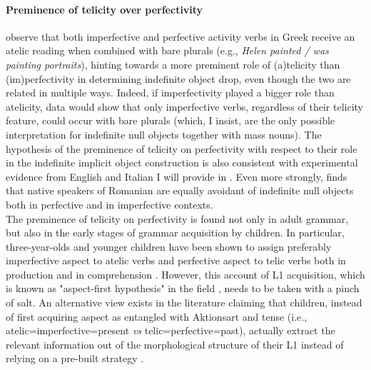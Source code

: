 \paragraph{Preminence of telicity over perfectivity}
\textcite[1598]{TsimpliPapadopoulou2006} observe that both imperfective and perfective activity verbs in Greek receive an atelic reading when combined with bare plurals (e.g., \textit{Helen painted / was painting portraits}), hinting towards a more preminent role of (a)telicity than (im)perfectivity in determining indefinite object drop, even though the two are related in multiple ways. Indeed, if imperfectivity played a bigger role than atelicity, data would show that only imperfective verbs, regardless of their telicity feature, could occur with bare plurals (which, I insist, are the only possible interpretation for indefinite null objects together with mass nouns). The hypothesis of the preminence of telicity on perfectivity with respect to their role in the indefinite implicit object construction is also consistent with experimental evidence from English and Italian I will provide in . Even more strongly, \textcite{Stoica2017} finds that native speakers of Romanian are equally avoidant of indefinite null objects both in perfective and in imperfective contexts.\\
The preminence of telicity on perfectivity is found not only in adult grammar, but also in the early stages of grammar acquisition by children. In particular, three-year-olds and younger children have been shown to assign preferably imperfective aspect to atelic verbs and perfective aspect to telic verbs both in production and in comprehension \parencite{Medina2007, olsenEtAl1998acquiring, wagner2001aspectual}. However, this account of L1 acquisition, which is known as "aspect-first hypothesis" in the field \parencite{antinucci1976children}, needs to be taken with a pinch of salt. An alternative view exists in the literature claiming that children, instead of first acquiring aspect as entangled with Aktionsart and tense (i.e., atelic=imperfective=present \textit{vs} telic=perfective=past), actually extract the relevant information out of the morphological structure of their L1 instead of relying on a pre-built strategy \parencite{bertinetto2021acquisition, BertinettoLenciEtAl2015}.

